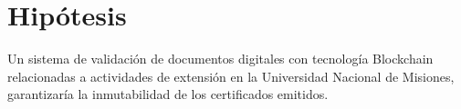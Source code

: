 \section{Hipótesis}
Un sistema de validación de documentos digitales con tecnología  Blockchain  
relacionadas a actividades de extensión en la Universidad Nacional de Misiones, garantizaría 
la inmutabilidad de los certificados emitidos.  
